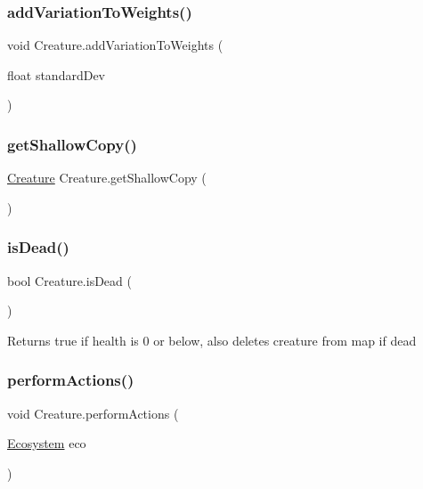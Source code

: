 \subsubsection{\texorpdfstring{add\+Variation\+To\+Weights()}{addVariationToWeights()}}
{\footnotesize\ttfamily void Creature.\+add\+Variation\+To\+Weights (\begin{DoxyParamCaption}\item[{float}]{standard\+Dev }\end{DoxyParamCaption})}

\mbox{\label{class_creature_a1095c7239ce30cb170ec739c343719fb}} 
\subsubsection{\texorpdfstring{get\+Shallow\+Copy()}{getShallowCopy()}}
{\footnotesize\ttfamily \mbox{\hyperlink{class_creature}{Creature}} Creature.\+get\+Shallow\+Copy (\begin{DoxyParamCaption}{ }\end{DoxyParamCaption})}

\mbox{\label{class_creature_a1938298b04f9a74b1692771a9f050478}} 
\subsubsection{\texorpdfstring{is\+Dead()}{isDead()}}
{\footnotesize\ttfamily bool Creature.\+is\+Dead (\begin{DoxyParamCaption}{ }\end{DoxyParamCaption})}



Returns true if health is 0 or below, also deletes creature from map if dead 

\mbox{\label{class_creature_a4bdf06ee073ffb00f7410f791caaccdc}} 
\subsubsection{\texorpdfstring{perform\+Actions()}{performActions()}}
{\footnotesize\ttfamily void Creature.\+perform\+Actions (\begin{DoxyParamCaption}\item[{\mbox{\hyperlink{class_ecosystem}{Ecosystem}}}]{eco }\end{DoxyParamCaption})}



